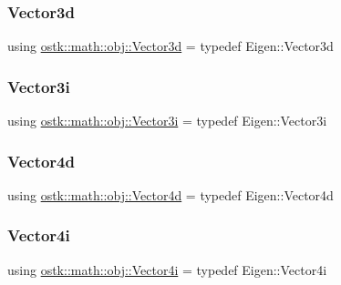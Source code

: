 \mbox{\label{namespaceostk_1_1math_1_1obj_a18744cbf433bce59f6758d9fe3b1dff1}} 
\subsubsection{\texorpdfstring{Vector3d}{Vector3d}}
{\footnotesize\ttfamily using \hyperlink{namespaceostk_1_1math_1_1obj_a18744cbf433bce59f6758d9fe3b1dff1}{ostk\+::math\+::obj\+::\+Vector3d} = typedef Eigen\+::\+Vector3d}

\mbox{\label{namespaceostk_1_1math_1_1obj_a8e5bafdb8928c3fd53af1efa47f3727d}} 
\subsubsection{\texorpdfstring{Vector3i}{Vector3i}}
{\footnotesize\ttfamily using \hyperlink{namespaceostk_1_1math_1_1obj_a8e5bafdb8928c3fd53af1efa47f3727d}{ostk\+::math\+::obj\+::\+Vector3i} = typedef Eigen\+::\+Vector3i}

\mbox{\label{namespaceostk_1_1math_1_1obj_a1eb1eefe1cb56bfc7d2b88d55acfb817}} 
\subsubsection{\texorpdfstring{Vector4d}{Vector4d}}
{\footnotesize\ttfamily using \hyperlink{namespaceostk_1_1math_1_1obj_a1eb1eefe1cb56bfc7d2b88d55acfb817}{ostk\+::math\+::obj\+::\+Vector4d} = typedef Eigen\+::\+Vector4d}

\mbox{\label{namespaceostk_1_1math_1_1obj_a5f75d55c72fdf6221b158406f36eba43}} 
\subsubsection{\texorpdfstring{Vector4i}{Vector4i}}
{\footnotesize\ttfamily using \hyperlink{namespaceostk_1_1math_1_1obj_a5f75d55c72fdf6221b158406f36eba43}{ostk\+::math\+::obj\+::\+Vector4i} = typedef Eigen\+::\+Vector4i}

